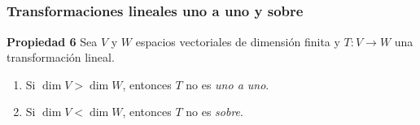 \begin{frame}
\end{frame}


\subsection{}

\begin{frame}\frametitle{Transformaciones lineales uno a uno y sobre}
	
	\begin{prop}{\textbf{Propiedad 6}}
		\justifying
		Sea $V$ y $W$ espacios vectoriales de dimensión finita y $T:V\to W$ una transformación lineal. 
		\begin{enumerate}
			\item[\labelname{$a$}] Si $\dim V > \dim W$, entonces $T$ no es \textit{uno a uno}.
			\item[\labelname{$b$}] Si $\dim V < \dim W$, entonces $T$ no es \textit{sobre}.
		\end{enumerate}
	\end{prop}	
	
	
\end{frame}


\subsection{}

